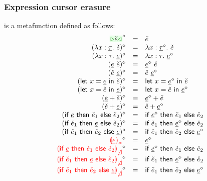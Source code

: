 \documentclass[formalism.tex]{subfiles}
\begin{document}
\subsubsection{Expression cursor erasure}
\label{sec:typed-expression-cursor-erasure}
\judgbox{\ensuremath{\cursorErase{\ZMV}}} is a metafunction defined as follows:
%
\newcommand{\cursorErasesToRow}[2]{\ensuremath{\cursorErase{#1} & = & #2}}
\[\begin{array}{rcl}
  \cursorErasesToRow{\ZCursor{\ECMV}}{\ECMV} \\
  \cursorErasesToRow{(\ZLamT{x}{\ZTMV}{\ECMV})}{\ECLam{x}{\cursorErase{\ZTMV}}{\ECMV}} \\
  \cursorErasesToRow{(\ZLamE{x}{\TMV}{\ZMV})}{\ECLam{x}{\TMV}{\cursorErase{\ZMV}}} \\
  \cursorErasesToRow{(\ZApL{\ZMV}{\ECMV})}{\ECAp{\cursorErase{\ZMV}}{\ECMV}} \\
  \cursorErasesToRow{(\ZApR{\ECMV}{\ZMV})}{\ECAp{\ECMV}{\cursorErase{\ZMV}}} \\
  \cursorErasesToRow{(\ZLetL{x}{\ZMV}{\ECMV})}{\ECLet{x}{\cursorErase{\ZMV}}{\ECMV}} \\
  \cursorErasesToRow{(\ZLetR{x}{\ECMV}{\ZMV})}{\ECLet{x}{\ECMV}{\cursorErase{\ZMV}}} \\
  \cursorErasesToRow{(\ZPlusL{\ZMV}{\ECMV})}{\ECPlus{\cursorErase{\ZMV}}{\ECMV}} \\
  \cursorErasesToRow{(\ZPlusR{\ECMV}{\ZMV})}{\ECPlus{\ECMV}{\cursorErase{\ZMV}}} \\
  \cursorErasesToRow{(\ZIfC{\ZMV}{\ECMV_1}{\ECMV_2})}{\ECIf{\cursorErase{\ZMV}}{\ECMV_1}{\ECMV_2}} \\
  \cursorErasesToRow{(\ZIfL{\ECMV_1}{\ZMV}{\ECMV_2})}{\ECIf{\ECMV_1}{\cursorErase{\ZMV}}{\ECMV_2}} \\
  \cursorErasesToRow{(\ZIfL{\ECMV_1}{\ECMV_2}{\ZMV})}{\ECIf{\ECMV_1}{\ECMV_2}{\cursorErase{\ZMV}}} \\
  \cursorErasesToRow{\ZInconType{\ZMV}}{\cursorErase{\ZMV}} \\
  \cursorErasesToRow{\ZInconBrC{\ZMV}{\ECMV_1}{\ECMV_2}}{\ECIf{\cursorErase{\ZMV}}{\ECMV_1}{\ECMV_2}} \\
  \cursorErasesToRow{\ZInconBrL{\ECMV_1}{\ZMV}{\ECMV_2}}{\ECIf{\ECMV_1}{\cursorErase{\ZMV}}{\ECMV_2}} \\
  \cursorErasesToRow{\ZInconBrR{\ECMV_1}{\ECMV_2}{\ZMV}}{\ECIf{\ECMV_1}{\ECMV_2}{\cursorErase{\ZMV}}} \\
\end{array}\]
\end{document}

